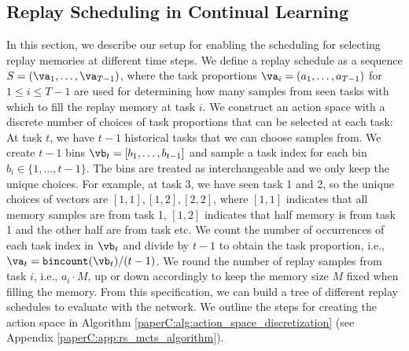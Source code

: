 

\subsection{Replay Scheduling in Continual Learning}\label{paperC:sec:replay_scheduling_in_continual_learning}

In this section, we describe our setup for enabling the scheduling for selecting replay memories at different time steps. We define a replay schedule as a sequence $S = (\va_1, \dots, \va_{T-1})$, where the task proportions $\va_i = (a_1, \dots, a_{T-1})$ for $1 \leq i \leq T-1$ are used for determining how many samples from seen tasks with which to fill the replay memory at task $i$. We construct an action space with a discrete number of choices of task proportions that can be selected at each task: At task $t$, we have $t-1$ historical tasks that we can choose samples from. We create $t-1$ bins $\vb_t = [b_1, \dots, b_{t-1}]$ and sample a task index for each bin $b_i \in \{1, \dots, t-1\}$. The bins are treated as interchangeable and we only keep the unique choices. For example, at task 3, we have seen task 1 and 2, so the unique choices of vectors are $[1,1], [1,2], [2,2]$, where $[1,1]$ indicates that all memory samples are from task 1, $[1,2]$ indicates that half memory is from task 1 and the other half are from task etc. We count the number of occurrences of each task index in $\vb_t$ and divide by $t-1$ to obtain the task proportion, i.e., $\va_t = \texttt{bincount}(\vb_t) / (t-1)$. We round the number of replay samples from task $i$, i.e., $a_i \cdot M$, up or down accordingly to keep the memory size $M$ fixed when filling the memory. From this specification, we can build a tree of different replay schedules to evaluate with the network. We outline the steps for creating the action space in Algorithm \ref{paperC:alg:action_space_discretization} (see Appendix \ref{paperC:app:rs_mcts_algorithm}). 


